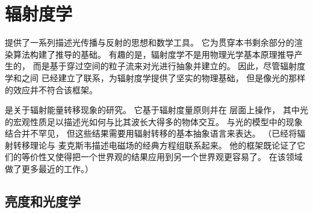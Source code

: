 \section{辐射度学}\label{sec:辐射度学}
 
提供了一系列描述光传播与反射的思想和数学工具。
它为贯穿本书剩余部分的渲染算法构建了推导的基础。
有趣的是，辐射度学不是用物理光学基本原理推导产生的，
而是基于穿过空间的粒子流来对光进行抽象并建立的。
因此，尽管辐射度学和之间
已经建立了联系，为辐射度学提供了坚实的物理基础，
但是像光的那样的效应并不符合该框架。

是关于辐射能量转移现象的研究。
它基于辐射度量原则并在
层面上操作，
其中光的宏观性质足以描述光如何与比其波长大得多的物体交互。
与光的模型中的现象结合并不罕见，
但这些结果需要用辐射转移的基本抽象语言来表达。
（\citet{PREISENDORFER19653}已经将辐射转移理论与
麦克斯韦描述电磁场的经典方程组联系起来。
他的框架既论证了它们的等价性又使得把一个世界观的结果应用到另一个世界观更容易了。
\citet{Fante:81}在该领域做了更多最近的工作。）


\subsection{亮度和光度学}\label{sub:亮度和光度学}